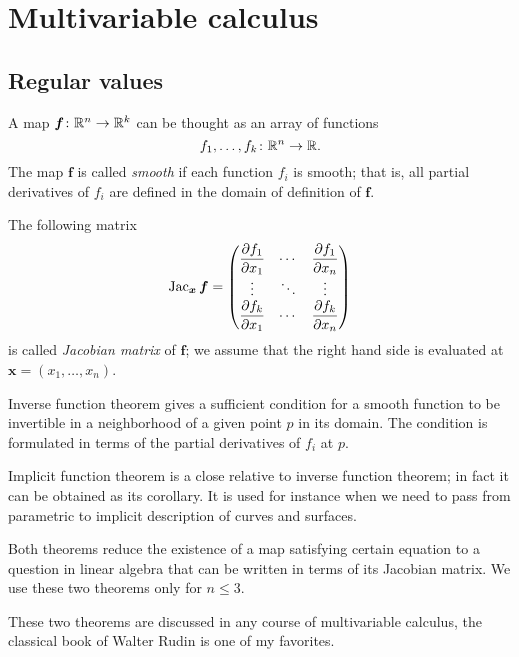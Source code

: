 \chapter{Multivariable calculus}

\section{Regular values}

A map $\bm{f}\colon\mathbb{R}^n\to\mathbb{R}^k$ can be thought as an array of functions 
\[f_1,\dots,f_k\colon\mathbb{R}^n\to \mathbb{R}.\]
The map $\bm{f}$ is called \emph{smooth} if each function $f_i$ is smooth;
that is, all partial derivatives of $f_i$ are defined in the domain of definition of $\bm{f}$.

The following matrix
\[\mathop{\rm Jac}\nolimits_{\bm{x}}\bm{f}=
\begin{pmatrix}
\dfrac{\partial f_1}{\partial x_1} & \cdots & \dfrac{\partial f_1}{\partial x_n}\\
\vdots & \ddots & \vdots\\
\dfrac{\partial f_k}{\partial x_1} & \cdots & \dfrac{\partial f_k}{\partial x_n} \end{pmatrix}\]
is called \emph{Jacobian matrix} of $\bm{f}$; we assume that the right hand side is evaluated at $\bm{x}=(x_1,\dots,x_n)$.

Inverse function theorem gives a sufficient condition for a smooth function to be invertible in a neighborhood of a given point $p$ in its domain.
The condition is formulated in terms of the partial derivatives of $f_i$ at $p$.

Implicit function theorem is a close relative to inverse function theorem;
in fact it can be obtained as its corollary.
It is used for instance when we need to pass from parametric to implicit description of curves and surfaces.

Both theorems reduce the existence of a map satisfying certain equation to a question in linear algebra that can be written in terms of its Jacobian matrix.
We use these two theorems only for $n\le 3$.

These two theorems are discussed in any course of multivariable calculus, the classical book of Walter Rudin \cite{rudin} is one of my favorites.

